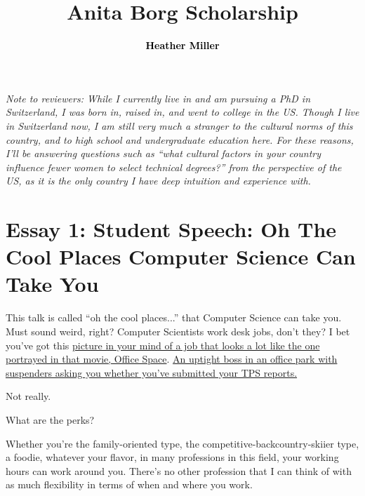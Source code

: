 \documentclass[acmtocl]{acmtrans2m}
\title{{\color{Black}Anita Borg Scholarship}}
\author{\textcolor{Black}{\textbf{Heather Miller}}}
\begin{document}
\setmonofont[Mapping=tex-text,Scale=0.9]{Inconsolata}
%
\maketitle

{\em Note to reviewers: While I currently live in and am pursuing a PhD in
Switzerland, I was born in, raised in, and went to college in the US. Though I
live in Switzerland now, I am still very much a stranger to the cultural norms
of this country, and to high school and undergraduate education here. For
these reasons, I'll be answering questions such as ``what cultural factors in
your country influence fewer women to select technical degrees?'' from the
perspective of the US, as it is the only country I have deep intuition and
experience with.}

\section*{\textbf{Essay 1:} Student Speech: Oh The Cool Places Computer Science Can Take You}




This talk is called ``oh the cool places...'' that Computer Science can take you.
Must sound weird, right? Computer Scientists work desk jobs, don't they? I bet
you've got this \href{http://g-ecx.images-amazon.com/images/G/01/dvd/fox/officespace/Office3\_L.jpg}{picture in your mind
of a job that looks a lot like the one portrayed in that movie, Office Space}.
\href{http://kentuckybasketballforum.com/uploads/images/office\_space\_initech.jpg}{An uptight boss in an office park with suspenders asking you whether
you've submitted your TPS reports.}

Not really.

What are the perks?

Whether you're the family-oriented type, the competitive-backcountry-skiier
type, a foodie, whatever your flavor, in many professions in this field, your
working hours can work around you. There's no other profession that I can
think of with as much flexibility in terms of when and where you work.
\end{document}
